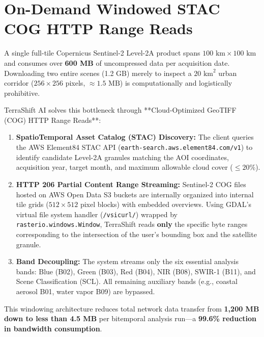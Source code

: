 \section{On-Demand Windowed STAC COG HTTP Range Reads}
\label{sec:arch_cog_streaming}
A single full-tile Copernicus Sentinel-2 Level-2A product spans $100\text{ km} \times 100\text{ km}$ and consumes over \textbf{600 MB} of uncompressed data per acquisition date. Downloading two entire scenes (1.2 GB) merely to inspect a $20\text{ km}^2$ urban corridor ($256 \times 256$ pixels, $\approx 1.5\text{ MB}$) is computationally and logistically prohibitive.

TerraShift AI solves this bottleneck through **Cloud-Optimized GeoTIFF (COG) HTTP Range Reads**:
\begin{enumerate}
    \item \textbf{SpatioTemporal Asset Catalog (STAC) Discovery:} The client queries the AWS Element84 STAC API (\texttt{earth-search.aws.element84.com/v1}) to identify candidate Level-2A granules matching the AOI coordinates, acquisition year, target month, and maximum allowable cloud cover ($\le 20\%$).
    \item \textbf{HTTP 206 Partial Content Range Streaming:} Sentinel-2 COG files hosted on AWS Open Data S3 buckets are internally organized into internal tile grids ($512 \times 512$ pixel blocks) with embedded overviews. Using GDAL's virtual file system handler (\texttt{/vsicurl/}) wrapped by \texttt{rasterio.windows.Window}, TerraShift reads \textbf{only} the specific byte ranges corresponding to the intersection of the user's bounding box and the satellite granule.
    \item \textbf{Band Decoupling:} The system streams only the six essential analysis bands: Blue (B02), Green (B03), Red (B04), NIR (B08), SWIR-1 (B11), and Scene Classification (SCL). All remaining auxiliary bands (e.g., coastal aerosol B01, water vapor B09) are bypassed.
\end{enumerate}

This windowing architecture reduces total network data transfer from \textbf{1,200 MB down to less than 4.5 MB} per bitemporal analysis run—a \textbf{99.6\% reduction in bandwidth consumption}.

